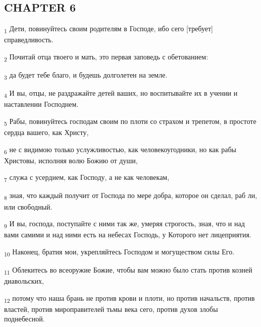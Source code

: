 \subsection{CHAPTER 6}
\begin{tcolorbox}
\textsubscript{1} Дети, повинуйтесь своим родителям в Господе, ибо сего [требует] справедливость.
\end{tcolorbox}
\begin{tcolorbox}
\textsubscript{2} Почитай отца твоего и мать, это первая заповедь с обетованием:
\end{tcolorbox}
\begin{tcolorbox}
\textsubscript{3} да будет тебе благо, и будешь долголетен на земле.
\end{tcolorbox}
\begin{tcolorbox}
\textsubscript{4} И вы, отцы, не раздражайте детей ваших, но воспитывайте их в учении и наставлении Господнем.
\end{tcolorbox}
\begin{tcolorbox}
\textsubscript{5} Рабы, повинуйтесь господам своим по плоти со страхом и трепетом, в простоте сердца вашего, как Христу,
\end{tcolorbox}
\begin{tcolorbox}
\textsubscript{6} не с видимою только услужливостью, как человекоугодники, но как рабы Христовы, исполняя волю Божию от души,
\end{tcolorbox}
\begin{tcolorbox}
\textsubscript{7} служа с усердием, как Господу, а не как человекам,
\end{tcolorbox}
\begin{tcolorbox}
\textsubscript{8} зная, что каждый получит от Господа по мере добра, которое он сделал, раб ли, или свободный.
\end{tcolorbox}
\begin{tcolorbox}
\textsubscript{9} И вы, господа, поступайте с ними так же, умеряя строгость, зная, что и над вами самими и над ними есть на небесах Господь, у Которого нет лицеприятия.
\end{tcolorbox}
\begin{tcolorbox}
\textsubscript{10} Наконец, братия мои, укрепляйтесь Господом и могуществом силы Его.
\end{tcolorbox}
\begin{tcolorbox}
\textsubscript{11} Облекитесь во всеоружие Божие, чтобы вам можно было стать против козней диавольских,
\end{tcolorbox}
\begin{tcolorbox}
\textsubscript{12} потому что наша брань не против крови и плоти, но против начальств, против властей, против мироправителей тьмы века сего, против духов злобы поднебесной.
\end{tcolorbox}
